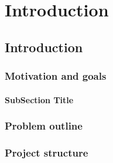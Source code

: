 \part{Introduction}
\chapter{Introduction}

\section{Motivation and goals}


\subsection{SubSection Title}








\section{Problem outline}







\section{Project structure}

